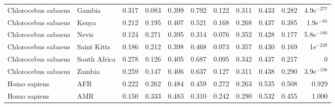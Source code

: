 \begin{center}
\begin{adjustbox}{width = 1\textwidth}
\begin{tabular}{llrrrrrrrrr}
 Chlorocebus sabaeus &                    Gambia &                              0.317 &                               0.083 &                 0.399 &                 0.792 &                              0.122 &                               0.311 &                 0.433 &                 0.282 & 4.9e$^{-277}$ \\
 Chlorocebus sabaeus &                     Kenya &                              0.212 &                               0.195 &                 0.407 &                 0.521 &                              0.168 &                               0.268 &                 0.437 &                 0.385 &  1.9e$^{-83}$ \\
 Chlorocebus sabaeus &                     Nevis &                              0.124 &                               0.271 &                 0.395 &                 0.314 &                              0.076 &                               0.352 &                 0.428 &                 0.177 & 5.8e$^{-180}$ \\
 Chlorocebus sabaeus &               Saint Kitts &                              0.186 &                               0.212 &                 0.398 &                 0.468 &                              0.073 &                               0.357 &                 0.430 &                 0.169 &   1e$^{-249}$ \\
 Chlorocebus sabaeus &              South Africa &                              0.278 &                               0.126 &                 0.405 &                 0.687 &                              0.095 &                               0.342 &                 0.437 &                 0.217 &             0 \\
 Chlorocebus sabaeus &                    Zambia &                              0.259 &                               0.147 &                 0.406 &                 0.637 &                              0.127 &                               0.311 &                 0.438 &                 0.290 & 3.9e$^{-198}$ \\
        Homo sapiens &                       AFR &                              0.222 &                               0.262 &                 0.484 &                 0.459 &                              0.272 &                               0.263 &                 0.535 &                 0.508 &         0.929 \\
        Homo sapiens &                       AMR &                              0.150 &                               0.333 &                 0.483 &                 0.310 &                              0.242 &                               0.290 &                 0.532 &                 0.455 &         1.000 \\

\end{tabular}
\end{adjustbox}
\end{center}

